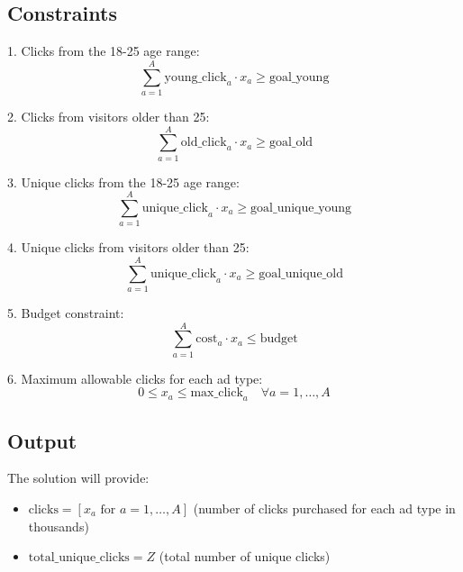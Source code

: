 \documentclass{article}
\begin{document}
\subsection*{Constraints}
1. Clicks from the 18-25 age range:
\[
\sum_{a=1}^{A} \text{young\_click}_{a} \cdot x_a \geq \text{goal\_young}
\]

2. Clicks from visitors older than 25:
\[
\sum_{a=1}^{A} \text{old\_click}_{a} \cdot x_a \geq \text{goal\_old}
\]

3. Unique clicks from the 18-25 age range:
\[
\sum_{a=1}^{A} \text{unique\_click}_{a} \cdot x_a \geq \text{goal\_unique\_young}
\]

4. Unique clicks from visitors older than 25:
\[
\sum_{a=1}^{A} \text{unique\_click}_{a} \cdot x_a \geq \text{goal\_unique\_old}
\]

5. Budget constraint:
\[
\sum_{a=1}^{A} \text{cost}_{a} \cdot x_a \leq \text{budget}
\]

6. Maximum allowable clicks for each ad type:
\[
0 \leq x_a \leq \text{max\_click}_{a} \quad \forall a = 1, \ldots, A
\]

\subsection*{Output}
The solution will provide:
\begin{itemize}
    \item \( \text{clicks} = [x_a \text{ for } a = 1, \ldots, A] \) (number of clicks purchased for each ad type in thousands)
    \item \( \text{total\_unique\_clicks} = Z \) (total number of unique clicks)
\end{itemize}
\end{document}
